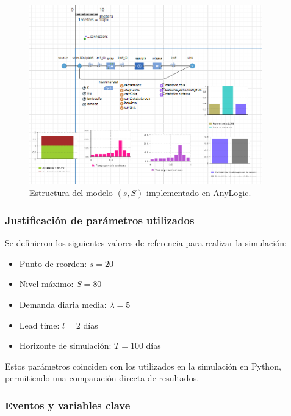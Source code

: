 \documentclass[12pt]{article}
\begin{document}
\vspace{0.5em}
\begin{figure}[H]
    \centering
    \includegraphics[width=0.9\textwidth]{graficas/modelos/ModeloMM1/diagrama_mm1.png}
    \caption{Estructura del modelo $(s, S)$ implementado en AnyLogic.}
\end{figure}

\subsubsection*{Justificación de parámetros utilizados}

Se definieron los siguientes valores de referencia para realizar la simulación:

\begin{itemize}
    \item Punto de reorden: \( s = 20 \)
    \item Nivel máximo: \( S = 80 \)
    \item Demanda diaria media: \( \lambda = 5 \)
    \item Lead time: \( l = 2 \) días
    \item Horizonte de simulación: \( T = 100\) días
\end{itemize}

Estos parámetros coinciden con los utilizados en la simulación en Python, permitiendo una comparación directa de resultados.

\subsubsection*{Eventos y variables clave}
\end{document}

